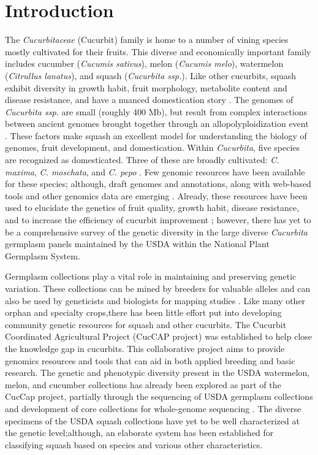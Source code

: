 \documentclass[utf8]{FrontiersinHarvard} %
\begin{document}
\section{Introduction}


The \emph{Cucurbitaceae} (Cucurbit) family is home to a number of vining species
mostly cultivated for their fruits.
This diverse and economically important family includes cucumber (\emph{Cucumis sativus}), melon (\emph{Cucumis melo}), watermelon (\emph{Citrullus lanatus}), and squash (\emph{Cucurbita ssp.})\citep{Ferriol}.
Like other cucurbits, squash exhibit diversity in growth habit, fruit morphology, metabolite content and disease resistance, and have a nuanced domestication story \citep{Chomicki2020,Paris2005}.
The genomes of \emph{Cucurbita ssp.} are small (roughly 400 Mb), but result from complex interactions between ancient genomes brought together through an allopolyploidization event \citep{Sun2017}.
These factors make squash an excellent model for understanding the biology of genomes, fruit development, and domestication.
Within \emph{Cucurbita}, five species are recognized as domesticated.
Three of these are broadly cultivated: \emph{C. maxima}, \emph{C. moschata}, and \emph{C. pepo} \citep{Ferriol}.
Few genomic resources have been available for these species; although, draft genomes and annotations, along with web-based tools and other genomics data are emerging \citep{Yu2022}.
Already, these resources have been used to elucidate the genetics of fruit quality, growth habit, disease resistance, and to increase the efficiency of cucurbit improvement \citep{MonteroPau2017,Zhong2017,Kazminska2018,Wu2019,Xanthopoulou2019,Hernandez2020}; however, there has yet to be a comprehensive survey of the genetic diversity in the large diverse \emph{Cucurbita} germplasm panels maintained by the USDA within the National Plant Germplasm System.

Germplasm collections play a vital role in maintaining and preserving genetic variation.
These collections can be mined by breeders for valuable alleles and can also be used by geneticists and biologists for mapping studies \citep{McCouch2020}.
Like many other orphan and specialty crops,there has been little effort put into developing community genetic resources for squash and other cucurbits.
The Cucurbit Coordinated Agricultural Project (CucCAP project) was established to help close the knowledge gap in cucurbits.
This collaborative project aims to provide genomics resources and tools that can aid in both applied breeding and basic research.
The genetic and phenotypic diversity present in the USDA watermelon, melon, and cucumber collections has already been explored as part of the CucCap project, partially through the sequencing of USDA germplasm collections and development of core collections for whole-genome sequencing \citep{Wang2021,Wang2018,Wu2019a}.
The diverse specimens of the USDA squash collections have yet to be well characterized at the genetic level;although, an elaborate system has been established for classifying squash based on species and various other characteristics.
\end{document}
